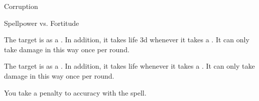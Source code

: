 \newpage
\begin{spellsection}{Corruption}

\begin{spellheader}
\end{spellheader}

\begin{spellcontent}

\begin{spelltargetinginfo}




\end{spelltargetinginfo}


\begin{spelleffects}




\begin{spellattack}{Spellpower vs. Fortitude}


\spellsuccess
The target is  as a .
In addition, it takes life  \minus3d whenever it takes a .
It can only take damage in this way once per round.



\spellcritical
The target is  as a .
In addition, it takes life  whenever it takes a .
It can only take damage in this way once per round.



\end{spellattack}





\end{spelleffects}

\end{spellcontent}
\begin{spellfooter}


\end{spellfooter}
\begin{spellsubcontent}


\begin{spellcantrip}

You take a  penalty to accuracy with the spell.

\end{spellcantrip}


\end{spellsubcontent}
\end{spellsection}


